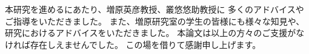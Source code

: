 本研究を進めるにあたり、増原英彦教授、叢悠悠助教授に
多くのアドバイスやご指導をいただきました。
また、増原研究室の学生の皆様にも様々な知見や、研究におけるアドバイスをいただきました。
本論文は以上の方々のご支援がなければ存在しえませんでした。
この場を借りて感謝申し上げます。
